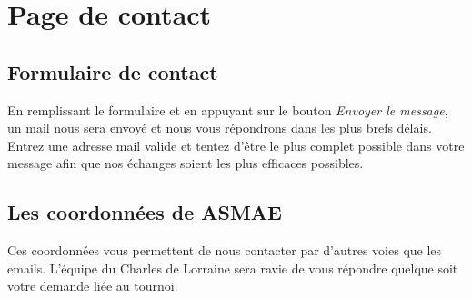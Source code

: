 \section{Page de contact}

\subsection{Formulaire de contact}

En remplissant le formulaire et en appuyant sur le bouton \textit{Envoyer le
message}, un mail nous sera envoyé et nous vous répondrons dans les plus brefs
délais. Entrez une adresse mail valide et tentez d'être le plus complet
possible dans votre message afin que nos échanges soient les plus efficaces
possibles. \newline

\subsection{Les coordonnées de ASMAE}

Ces coordonnées vous permettent de nous contacter par d'autres voies que les
emails. L'équipe du Charles de Lorraine sera ravie de vous répondre quelque
soit votre demande liée au tournoi. \newline
